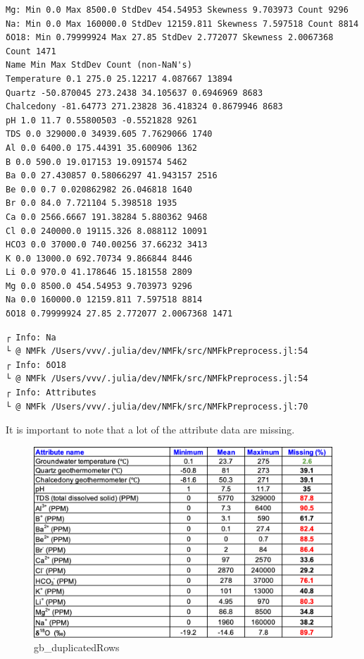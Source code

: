 \documentclass[11pt]{article}
\begin{document}
    \begin{Verbatim}[commandchars=\\\{\}]
Mg: Min 0.0 Max 8500.0 StdDev 454.54953 Skewness 9.703973 Count 9296
Na: Min 0.0 Max 160000.0 StdDev 12159.811 Skewness 7.597518 Count 8814
δO18: Min 0.79999924 Max 27.85 StdDev 2.772077 Skewness 2.0067368 Count 1471
Name Min Max StdDev Count (non-NaN's)
Temperature 0.1 275.0 25.12217 4.087667 13894
Quartz -50.870045 273.2438 34.105637 0.6946969 8683
Chalcedony -81.64773 271.23828 36.418324 0.8679946 8683
pH 1.0 11.7 0.55800503 -0.5521828 9261
TDS 0.0 329000.0 34939.605 7.7629066 1740
Al 0.0 6400.0 175.44391 35.600906 1362
B 0.0 590.0 19.017153 19.091574 5462
Ba 0.0 27.430857 0.58066297 41.943157 2516
Be 0.0 0.7 0.020862982 26.046818 1640
Br 0.0 84.0 7.721104 5.398518 1935
Ca 0.0 2566.6667 191.38284 5.880362 9468
Cl 0.0 240000.0 19115.326 8.088112 10091
HCO3 0.0 37000.0 740.00256 37.66232 3413
K 0.0 13000.0 692.70734 9.866844 8446
Li 0.0 970.0 41.178646 15.181558 2809
Mg 0.0 8500.0 454.54953 9.703973 9296
Na 0.0 160000.0 12159.811 7.597518 8814
δO18 0.79999924 27.85 2.772077 2.0067368 1471
    \end{Verbatim}

    \begin{Verbatim}[commandchars=\\\{\}]
┌ Info: Na
└ @ NMFk /Users/vvv/.julia/dev/NMFk/src/NMFkPreprocess.jl:54
┌ Info: δO18
└ @ NMFk /Users/vvv/.julia/dev/NMFk/src/NMFkPreprocess.jl:54
┌ Info: Attributes
└ @ NMFk /Users/vvv/.julia/dev/NMFk/src/NMFkPreprocess.jl:70
    \end{Verbatim}

    It is important to note that a lot of the attribute data are missing.

\begin{figure}
\centering
\includegraphics{../data/gb_duplicatedRows.png}
\caption{gb\_duplicatedRows}
\end{figure}
\end{document}
